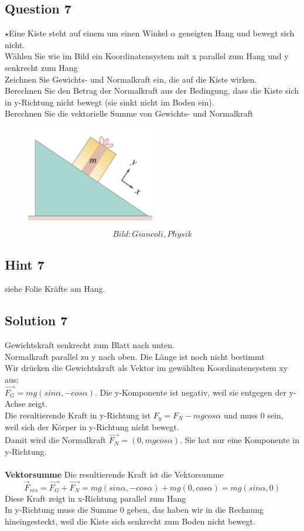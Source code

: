 \documentclass{article}
\begin{document}
\subsection*{Question 7}
$\star$Eine Kiste steht auf einem um einen Winkel $\alpha$ geneigten Hang und bewegt sich nicht.\\
Wählen Sie wie im Bild ein Koordinatensystem mit x parallel zum Hang und y senkrecht zum Hang\\
Zeichnen Sie Gewichts- und Normalkraft ein, die auf die Kiste wirken.\\
Berechnen Sie den Betrag der Normalkraft aus der Bedingung, dass die Kiste sich in y-Richtung nicht bewegt (sie sinkt nicht im Boden ein).\\
Berechnen Sie die vektorielle Summe von Gewichts- und Normalkraft
\begin{figure}[H]
    \centering
    \includegraphics[width=0.5\textwidth]{77.png}
    \label{fig:77}
    \end{figure}
\[Bild: Giancoli, Physik\]
\subsection*{Hint 7}
siehe Folie Kräfte am Hang.
\subsection*{Solution 7}
Gewichtskraft senkrecht zum Blatt nach unten.\\
Normalkraft parallel zu y nach oben. Die Länge ist noch nicht bestimmt\\
Wir drücken die Gewichtskraft als Vektor im gewählten Koordinatensystem xy aus:\\
$\vec{F_G}=mg(sin\alpha,-cos\alpha)$. Die y-Komponente ist negativ, weil sie entgegen der y-Achse zeigt.\\
Die resultierende Kraft in y-Richtung ist $F_y=F_N-mgcos\alpha$ und muss 0 sein, weil sich der Körper in y-Richtung nicht bewegt.\\
Damit wird die Normalkraft $\vec{F_N}=(0,mgcos\alpha)$. Sie hat nur eine Komponente in y-Richtung.\\\\
\textbf{Vektorsumme}
Die resultierende Kraft ist die Vektorsumme
\[{\vec{F}}_{res}=\vec{F_G}+\vec{F_N}=mg(sin\alpha,-cos\alpha)+mg(0,cos\alpha)=mg(sin\alpha,0)\]
Diese Kraft zeigt in x-Richtung parallel zum Hang\\
In y-Richtung muss die Summe 0 geben, das haben wir in die Rechnung hineingesteckt, weil die Kiste sich senkrecht zum Boden nicht bewegt.
\end{document}
